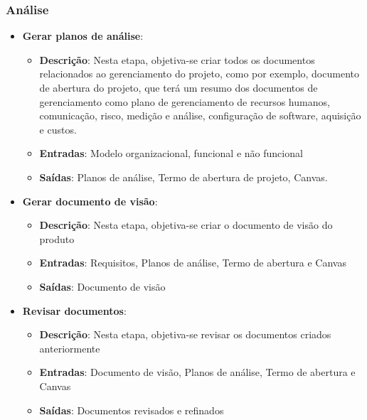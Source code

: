\subsubsection{Análise}

\begin{itemize}
  \item \textbf{Gerar planos de análise}:
  \begin{itemize}
    \item \textbf{Descrição}: Nesta etapa, objetiva-se criar todos os documentos relacionados ao gerenciamento do
      projeto, como por exemplo, documento de abertura do projeto, que terá um resumo dos documentos de gerenciamento
      como plano de gerenciamento de recursos humanos, comunicação, risco, medição e análise, configuração de
      software, aquisição e custos.
    \item \textbf{Entradas}: Modelo organizacional, funcional e não funcional
    \item \textbf{Saídas}: Planos de análise, Termo de abertura de projeto, Canvas.
  \end{itemize}
  \item \textbf{Gerar documento de visão}:
  \begin{itemize}
    \item \textbf{Descrição}: Nesta etapa, objetiva-se criar o documento de visão do produto
    \item \textbf{Entradas}: Requisitos, Planos de análise, Termo de abertura e Canvas
    \item \textbf{Saídas}: Documento de visão
  \end{itemize}
  \item \textbf{Revisar documentos}:
  \begin{itemize}
    \item \textbf{Descrição}: Nesta etapa, objetiva-se revisar os documentos criados anteriormente
    \item \textbf{Entradas}: Documento de visão, Planos de análise, Termo de abertura e Canvas
    \item \textbf{Saídas}: Documentos revisados e refinados
  \end{itemize}
\end{itemize}
